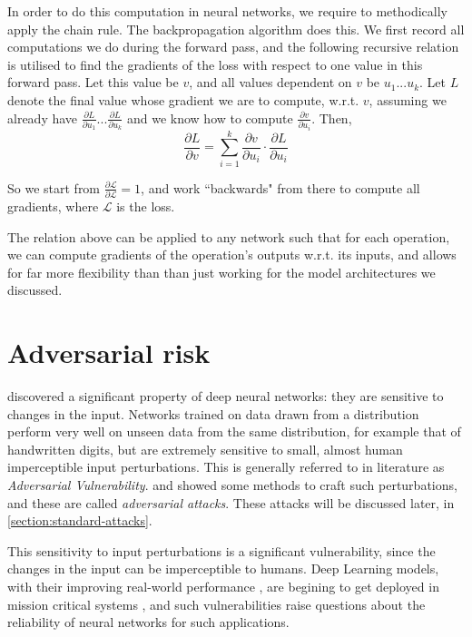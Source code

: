 \documentclass{ociamthesis}
\begin{document}
In order to do this computation in neural networks, we require to methodically
apply the chain rule. The backpropagation algorithm does this. We first record
all computations we do during the forward pass, and the following recursive
relation is utilised to find the gradients of the loss with respect to one value
in this forward pass. Let this value be $v$, and all values dependent on $v$ be
$u_1... u_k$. Let $L$ denote the final value whose gradient we are to compute,
w.r.t. $v$, assuming we already have $\frac{\partial L}{\partial u_1}...
\frac{\partial L}{\partial u_k}$ and we know how to compute $\frac{\partial
v}{\partial u_i}$. Then,
\begin{equation*}
    \frac{\partial L}{\partial v} = \sum_{i=1}^k {\frac{\partial
v}{\partial u_i}\cdot \frac{\partial L}{\partial u_i}}
\end{equation*}

So we start from $\frac{\partial \mathcal{L}}{\partial \mathcal{L}}=1$, and work
``backwards" from there to compute all gradients, where $\mathcal{L}$ is the
loss.

The relation above can be applied to any network such that for each operation,
we can compute gradients of the operation's outputs w.r.t. its inputs, and
allows for far more flexibility than than just working for the model
architectures we discussed.

\section{Adversarial risk}

\citet{42503} discovered a significant property of deep neural networks: they
are sensitive to changes in the input. Networks trained on data drawn from a
distribution perform very well on unseen data from the same distribution, for
example that of handwritten digits, but are extremely sensitive to small, almost
human imperceptible input perturbations. This is generally referred to in
literature as \emph{Adversarial Vulnerability}.
\citet{Goodfellow2015ExplainingAH} and \citet{madry2019deep} showed some methods
to craft such perturbations, and these are called \emph{adversarial attacks}.
These attacks will be discussed later, in \cref{section:standard-attacks}.

This sensitivity to input perturbations is a significant vulnerability, since
the changes in the input can be imperceptible to humans. Deep Learning models,
with their improving real-world performance
\citep{imagenet,imagenet-superhuman}, are begining to get deployed in mission
critical systems \citep{adv-vuln-in-mission-critical}, and such vulnerabilities
raise questions about the reliability of neural networks for such applications.
\end{document}
